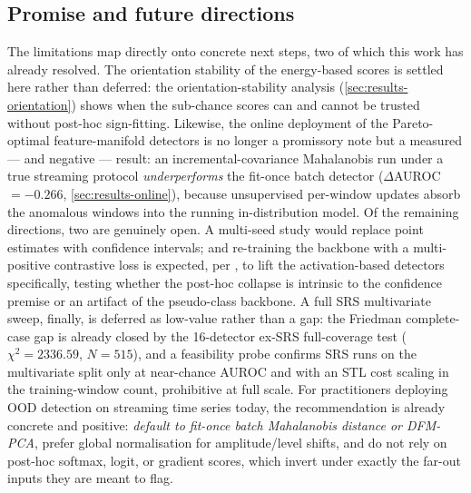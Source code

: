 \subsection{Promise and future directions}\label{sec:disc-future}
The limitations map directly onto concrete next steps, two of which this work has
already resolved. The orientation stability of the energy-based scores is settled
here rather than deferred: the orientation-stability analysis
(\cref{sec:results-orientation}) shows when the sub-chance scores can and cannot be
trusted without post-hoc sign-fitting. Likewise, the online deployment of the
Pareto-optimal feature-manifold detectors is no longer a promissory note but a
measured --- and negative --- result: an incremental-covariance Mahalanobis run
under a true streaming protocol \emph{underperforms} the fit-once batch detector
($\Delta$AUROC $= \num{-0.266}$, \cref{sec:results-online}), because unsupervised
per-window updates absorb the anomalous windows into the running in-distribution
model. Of the remaining directions, two are genuinely open. A multi-seed study would
replace point estimates with confidence intervals; and re-training the backbone with
a multi-positive contrastive loss is expected, per \citet{Gungor2025}, to lift the
activation-based detectors specifically, testing whether the post-hoc collapse is
intrinsic to the confidence premise or an artifact of the pseudo-class backbone. A
full SRS multivariate sweep, finally, is deferred as low-value rather than a gap: the
Friedman complete-case gap is already closed by the \num{16}-detector ex-SRS
full-coverage test ($\chi^2 = \num{2336.59}$, $N = \num{515}$), and a feasibility
probe confirms SRS runs on the multivariate split only at near-chance AUROC and with
an STL cost scaling in the training-window count, prohibitive at full scale. For
practitioners deploying OOD detection on streaming time series today, the
recommendation is already concrete and positive: \emph{default to fit-once batch
Mahalanobis distance or DFM-PCA}, prefer global normalisation for amplitude/level
shifts, and do not rely on post-hoc softmax, logit, or gradient scores, which invert
under exactly the far-out inputs they are meant to flag.
